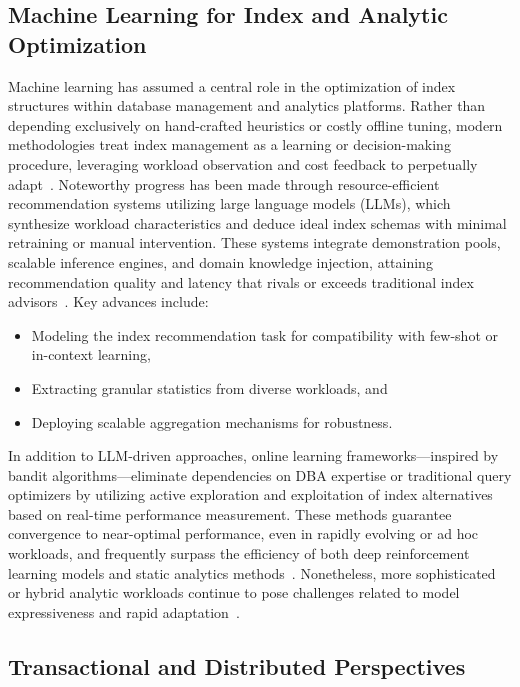 \documentclass[sigconf]{acmart}
\begin{document}
\subsection{Machine Learning for Index and Analytic Optimization}

Machine learning has assumed a central role in the optimization of index structures within database management and analytics platforms. Rather than depending exclusively on hand-crafted heuristics or costly offline tuning, modern methodologies treat index management as a learning or decision-making procedure, leveraging workload observation and cost feedback to perpetually adapt~\cite{ref110,ref111}. Noteworthy progress has been made through resource-efficient recommendation systems utilizing large language models (LLMs), which synthesize workload characteristics and deduce ideal index schemas with minimal retraining or manual intervention. These systems integrate demonstration pools, scalable inference engines, and domain knowledge injection, attaining recommendation quality and latency that rivals or exceeds traditional index advisors~\cite{ref110,ref115}. Key advances include:

\begin{itemize}
    \item Modeling the index recommendation task for compatibility with few-shot or in-context learning,
    \item Extracting granular statistics from diverse workloads, and
    \item Deploying scalable aggregation mechanisms for robustness.
\end{itemize}

In addition to LLM-driven approaches, online learning frameworks---inspired by bandit algorithms---eliminate dependencies on DBA expertise or traditional query optimizers by utilizing active exploration and exploitation of index alternatives based on real-time performance measurement. These methods guarantee convergence to near-optimal performance, even in rapidly evolving or ad hoc workloads, and frequently surpass the efficiency of both deep reinforcement learning models and static analytics methods~\cite{ref110}. Nonetheless, more sophisticated or hybrid analytic workloads continue to pose challenges related to model expressiveness and rapid adaptation~\cite{ref110,ref115}.

\subsection{Transactional and Distributed Perspectives}
\end{document}
